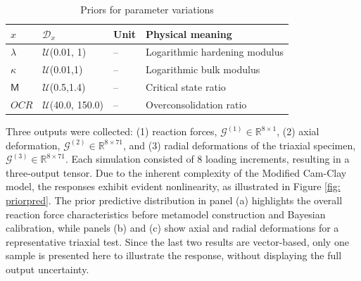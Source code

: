 \begin{table}[htbp]
\centering
\caption{Priors for parameter variations}
\begin{tabular}{llll}
\hline
$x$        & $\mathcal{D}_x$                            & Unit & Physical meaning                                                                        \\ \hline
$\lambda$      & $\mathcal{U}$(0.01, 1) & --  & Logarithmic hardening modulus                                                              \\
$\kappa$ & $\mathcal{U}$(0.01,1) & --  & Logarithmic bulk modulus
                                                   \\
$\mathsf{M}$  & $\mathcal{U}$(0.5,1.4) & --  & Critical state ratio                                                                \\
$OCR$      & $\mathcal{U}$(40.0, 150.0) & --  & Overconsolidation ratio                                                   \\
\hline
\end{tabular}
\label{table: input parameters}
\end{table}

Three outputs were collected: (1) reaction forces, $\mathcal{G}^{(1)} \in \mathbb{R}^{8 \times 1}$, (2) axial deformation, $\mathcal{G}^{(2)} \in \mathbb{R}^{8 \times 71}$, and (3) radial deformations of the triaxial specimen, $\mathcal{G}^{(3)} \in \mathbb{R}^{8 \times 71}$. Each simulation consisted of 8 loading increments, resulting in a three-output tensor. Due to the inherent complexity of the Modified Cam-Clay model, the responses exhibit evident nonlinearity, as illustrated in Figure \ref{fig: priorpred}. The prior predictive distribution in panel (a) highlights the overall reaction force characteristics before metamodel construction and Bayesian calibration, while panels (b) and (c) show axial and radial deformations for a representative triaxial test. Since the last two results are vector-based, only one sample is presented here to illustrate the response, without displaying the full output uncertainty.

